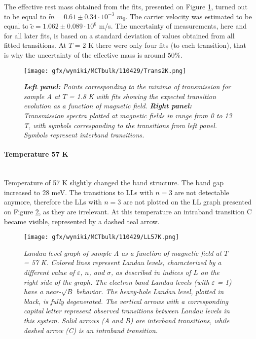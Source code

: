 \documentclass[titlepage,a4paper]{book}
\newcommand{\wciecie}{\quad\phantom{v}}
\newcommand{\myparagraph}[1]{\paragraph{#1}\mbox{}\\}
\begin{document}
The effective rest mass obtained from the fits, presented on Figure \ref{fig:Spectra_110429_2K}, turned out to be equal to $\tilde m = 0.61 \pm 0.34 \cdot 10^{-3}$ $m_0$. The carrier velocity was estimated to be equal to $\tilde{c} = 1.062 \pm 0.089 \cdot 10^6$ m/s. The uncertainty of measurements, here and for all later fits, is based on a standard deviation of values obtained from all fitted transitions. At $T$ = 2 K there were only four fits (to each transition), that is why the uncertainty of the effective mass is around 50\%.

\begin{figure}[H]
	\centering
	\texttt{[image: gfx/wyniki/MCTbulk/110429/Trans2K.png]}
	\vspace{-10pt}
	\caption{\textit{\textbf{Left panel:} Points corresponding to the minima of transmission for sample A at $T$ = 1.8 K with fits showing the expected transition evolution as a function of magnetic field. \textbf{Right panel:} Transmission spectra plotted at magnetic fields in range from 0 to 13 T, with symbols corresponding to the transitions from left panel. Symbols represent interband transitions.}}
	\label{fig:Spectra_110429_2K}
\end{figure} 


\myparagraph{Temperature 57 K}
\wciecie
Temperature of 57 K slightly changed the band structure. The band gap increased to 28 meV. The transitions to LLs with $n = 3$ are not detectable anymore, therefore the LLs with $n = 3$ are not plotted on the LL graph presented on Figure \ref{fig:LL_110429_57K}, as they are irrelevant. At this temperature an intraband transition C became visible, represented by a dashed teal arrow.

\begin{figure}[ht]
	\centering
	\texttt{[image: gfx/wyniki/MCTbulk/110429/LL57K.png]}
	\vspace{-10pt}
	\caption{\textit{Landau level graph of sample A as a function of magnetic field at $T$ = 57 K. Colored lines represent Landau levels, characterized by a different value of $\varepsilon$, $n$, and $\sigma$, as described in indices of $L$ on the right side of the graph. The electron band Landau levels (with $\varepsilon$ = 1) have a near-$\sqrt{B}$ behavior. The heavy-hole Landau level, plotted in black, is fully degenerated. The vertical arrows with a corresponding capital letter represent observed transitions between Landau levels in this system. Solid arrows (A and B) are interband transitions, while dashed arrow (C) is an intraband transition.}} 
	\label{fig:LL_110429_57K}
\end{figure}
\end{document}
